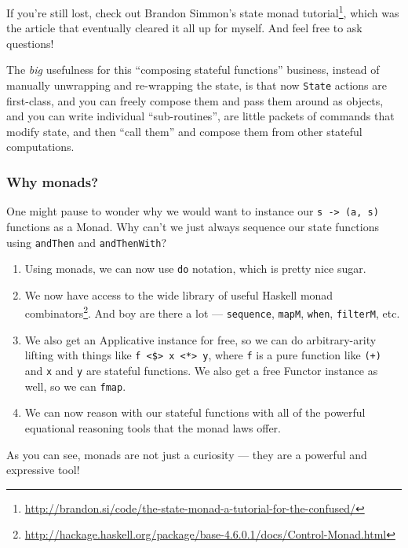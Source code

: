 \documentclass[]{article}
\renewcommand{\href}[2]{#2\footnote{\url{#1}}}
\begin{document}
If you're still lost, check out Brandon Simmon's
\href{http://brandon.si/code/the-state-monad-a-tutorial-for-the-confused/}{state
monad tutorial}, which was the article that eventually cleared it all up for
myself. And feel free to ask questions!

The \emph{big} usefulness for this ``composing stateful functions'' business,
instead of manually unwrapping and re-wrapping the state, is that now
\texttt{State} actions are first-class, and you can freely compose them and pass
them around as objects, and you can write individual ``sub-routines'', are
little packets of commands that modify state, and then ``call them'' and compose
them from other stateful computations.

\subsubsection{Why monads?}\label{why-monads}

One might pause to wonder why we would want to instance our
\texttt{s\ -\textgreater{}\ (a,\ s)} functions as a Monad. Why can't we just
always sequence our state functions using \texttt{andThen} and
\texttt{andThenWith}?

\begin{enumerate}
\def\labelenumi{\arabic{enumi}.}
\item
  Using monads, we can now use \texttt{do} notation, which is pretty nice sugar.
\item
  We now have access to the wide library of useful Haskell
  \href{http://hackage.haskell.org/package/base-4.6.0.1/docs/Control-Monad.html}{monad
  combinators}. And boy are there a lot --- \texttt{sequence}, \texttt{mapM},
  \texttt{when}, \texttt{filterM}, etc.
\item
  We also get an Applicative instance for free, so we can do arbitrary-arity
  lifting with things like
  \texttt{f\ \textless{}\$\textgreater{}\ x\ \textless{}*\textgreater{}\ y},
  where \texttt{f} is a pure function like \texttt{(+)} and \texttt{x} and
  \texttt{y} are stateful functions. We also get a free Functor instance as
  well, so we can \texttt{fmap}.
\item
  We can now reason with our stateful functions with all of the powerful
  equational reasoning tools that the monad laws offer.
\end{enumerate}

As you can see, monads are not just a curiosity --- they are a powerful and
expressive tool!
\end{document}
